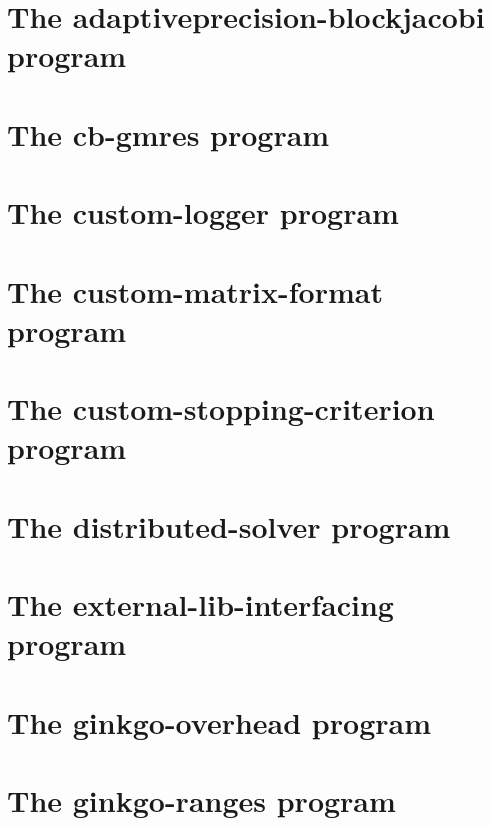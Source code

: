 \let\mypdfximage\pdfximage\def\pdfximage{\immediate\mypdfximage}\documentclass[twoside]{book}
\newcommand{\+}{\discretionary{\mbox{\scriptsize$\hookleftarrow$}}{}{}}
\begin{document}
\chapter{The adaptiveprecision-\/blockjacobi program}
\label{adaptiveprecision_blockjacobi}

\chapter{The cb-\/gmres program}
\label{cb_gmres}

\chapter{The custom-\/logger program}
\label{custom_logger}

\chapter{The custom-\/matrix-\/format program}
\label{custom_matrix_format}

\chapter{The custom-\/stopping-\/criterion program}
\label{custom_stopping_criterion}

\chapter{The distributed-\/solver program}
\label{distributed_solver}

\chapter{The external-\/lib-\/interfacing program}
\label{external_lib_interfacing}

\chapter{The ginkgo-\/overhead program}
\label{ginkgo_overhead}

\chapter{The ginkgo-\/ranges program}
\label{ginkgo_ranges}

\end{document}

